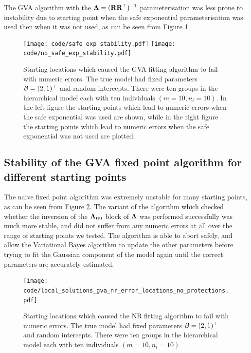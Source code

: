 The GVA algorithm with the ${\boldsymbol \Lambda} = ({\bf R} {\bf R}^\top)^{-1}$ parameterisation
was less prone to instability due to starting point when the safe exponential
parameterisation was used then when it was not used, as can be seen from Figure
\ref{fig:stability_locations_gva}. %
\begin{figure}[h]
	\texttt{[image: code/safe\_exp\_stability.pdf]}
	\texttt{[image: code/no\_safe\_exp\_stability.pdf]}
	\label{fig:stability_locations_gva}
	\caption{
        Starting locations which caused the GVA fitting algorithm to fail with
        numeric errors. The true model had fixed parameters ${\boldsymbol \beta} = (2,
        1)^\top$ and random intercepts. There were ten groups in the
        hierarchical model each	with ten individuals $(m=10, n_i=10)$. In the
        left figure the starting points which lead to numeric errors when the
        safe exponential was used are shown, while in the right figure the
        starting points which lead to numeric errors when the safe exponential
        was not used are plotted.
    }
\end{figure}

\subsection{Stability of the GVA fixed point algorithm for different starting
points}
The naive fixed point algorithm was extremely unstable for many starting
points, as can be seen from Figure \ref{fig:stability_locations_nr}.  The
variant of the algorithm which checked whether the inversion of the
${\boldsymbol \Lambda}_{{\bf u} {\bf u}}$ block of ${\boldsymbol \Lambda}$ was performed successfully was much
more stable, and did not suffer from any numeric errors at all over the range
of starting points we tested.  The algorithm is able to abort safely, and allow
the Variational Bayes algorithm to update the other parameters before trying to
fit the Gaussian component of the model again until the correct parameters are
accurately estimated.

\begin{figure}[h!]
	\texttt{[image: code/local\_solutions\_gva\_nr\_error\_locations\_no\_protections.pdf]}
	\label{fig:stability_locations_nr}
	\caption{Starting locations which caused the NR fitting algorithm to fail with numeric errors. The true model had fixed parameters ${\boldsymbol \beta} = (2, 1)^\top$ and random intercepts. There were ten groups in the
	hierarchical model each	with ten individuals $(m=10, n_i=10)$}
\end{figure}

